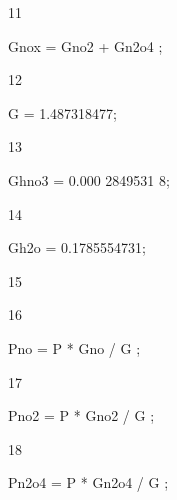 \documentclass[a4paper,portrait,12pt]{article}
\begin{document}
11





\begin{flushleft}
Gnox = Gno2 + Gn2o4 ;
\end{flushleft}





12





\begin{flushleft}
G = 1.487318477;
\end{flushleft}





13





\begin{flushleft}
Ghno3 = 0.000 2849531 8;
\end{flushleft}





14





\begin{flushleft}
Gh2o = 0.1785554731;
\end{flushleft}





15


16





\begin{flushleft}
Pno = P * Gno / G ;
\end{flushleft}





17





\begin{flushleft}
Pno2 = P * Gno2 / G ;
\end{flushleft}





18





\begin{flushleft}
Pn2o4 = P * Gn2o4 / G ;
\end{flushleft}
\end{document}
